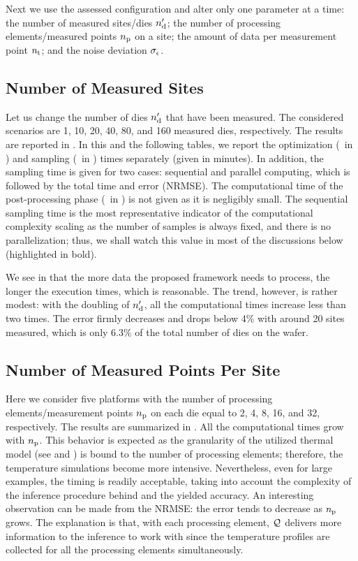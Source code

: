 Next we use the assessed configuration and alter only one parameter at a time: the number of measured sites/dies ${n_\text{d}'}$; the number of processing elements/measured points ${n_\text{p}}$ on a site; the amount of data per measurement point ${n_\text{t}}$; and the noise deviation $\sigma_\epsilon$.

\subsection{Number of Measured Sites}
Let us change the number of dies ${n_\text{d}'}$ that have been measured.
The considered scenarios are 1, 10, 20, 40, 80, and 160 measured dies, respectively.
The results are reported in .
In this and the following tables, we report the optimization (\ in ) and sampling (\ in ) times separately (given in minutes).
In addition, the sampling time is given for two cases: sequential and parallel computing, which is followed by the total time and error (NRMSE).
The computational time of the post-processing phase (\ in ) is not given as it is negligibly small.
The sequential sampling time is the most representative indicator of the computational complexity scaling as the number of samples is always fixed, and there is no parallelization; thus, we shall watch this value in most of the discussions below (highlighted in bold).

We see in  that the more data the proposed framework needs to process, the longer the execution times, which is reasonable.
The trend, however, is rather modest: with the doubling of ${n_\text{d}'}$, all the computational times increase less than two times.
The error firmly decreases and drops below 4\% with around 20 sites measured, which is only 6.3\% of the total number of dies on the wafer.

\subsection{Number of Measured Points Per Site}
Here we consider five platforms with the number of processing elements/measurement points ${n_\text{p}}$ on each die equal to 2, 4, 8, 16, and 32, respectively.
The results are summarized in .
All the computational times grow with ${n_\text{p}}$.
This behavior is expected as the granularity of the utilized thermal model (see  and \cite{ukhov2012}) is bound to the number of processing elements; therefore, the temperature simulations become more intensive.
Nevertheless, even for large examples, the timing is readily acceptable, taking into account the complexity of the inference procedure behind and the yielded accuracy.
An interesting observation can be made from the NRMSE: the error tends to decrease as ${n_\text{p}}$ grows.
The explanation is that, with each processing element, $\mathcal{Q}$ delivers more information to the inference to work with since the temperature profiles are collected for all the processing elements simultaneously.


